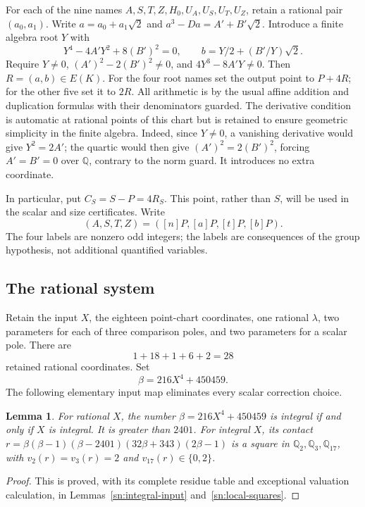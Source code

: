 \documentclass[11pt,a4paper]{article}
\newtheorem{lemma}[theorem]{Lemma}
\theoremstyle{definition}
\theoremstyle{remark}
\begin{document}
For each of the nine names $A,S,T,Z,H_0,U_A,U_S,U_T,U_Z$, retain a
rational pair $(a_0,a_1)$.  Write $a=a_0+a_1\sqrt2$ and
$a^3-Da=A'+B'\sqrt2$.  Introduce a finite algebra root $Y$ with
\[
 Y^4-4A'Y^2+8(B')^2=0,\qquad
 b=Y/2+(B'/Y)\sqrt2.
\]
Require $Y\ne0$, $(A')^2-2(B')^2\ne0$, and
$4Y^3-8A'Y\ne0$.  Then $R=(a,b)\in E(K)$.
For the four root names set the output point to $P+4R$; for the other
five set it to $2R$.  All arithmetic is by the usual affine addition
and duplication formulas with their denominators guarded.  The
derivative condition is automatic at rational points of this chart
but is retained to ensure geometric simplicity in the finite algebra.
Indeed, since $Y\ne0$, a vanishing derivative would give $Y^2=2A'$;
the quartic would then give $(A')^2=2(B')^2$, forcing $A'=B'=0$
over $\mathbb Q$, contrary to the norm guard.
It introduces no extra coordinate.

In particular, put $C_S=S-P=4R_S$.  This point, rather than $S$,
will be used in the scalar and size certificates.  Write
\[
 (A,S,T,Z)=([n]P,[a]P,[t]P,[b]P).
\]
The four labels are nonzero odd integers; the labels are consequences
of the group hypothesis, not additional quantified variables.

\subsection{The rational system}

Retain the input $X$, the eighteen point-chart coordinates, one
rational $\lambda$, two parameters for each of three comparison poles,
and two parameters for a scalar pole.  There are
\[
                            1+18+1+6+2=28
\]
retained rational coordinates.  Set
\[
                 \beta=216X^4+450459.
\]
The following elementary input map eliminates every scalar correction
choice.

\begin{lemma}\label{lem:u29-input-map}
For rational $X$, the number $\beta=216X^4+450459$ is integral
if and only if $X$ is integral. It is greater than $2401$.
For integral $X$, its contact
$r=\beta(\beta-1)(\beta-2401)(32\beta+343)(2\beta-1)$
is a square in $\mathbb Q_2,\mathbb Q_3,\mathbb Q_{17}$,
with $v_2(r)=v_3(r)=2$ and $v_{17}(r)\in\{0,2\}$.
\end{lemma}
\begin{proof}
This is proved, with its complete residue table and exceptional
valuation calculation, in Lemmas~\ref{sn:integral-input}
and~\ref{sn:local-squares}.
\end{proof}
\end{document}
